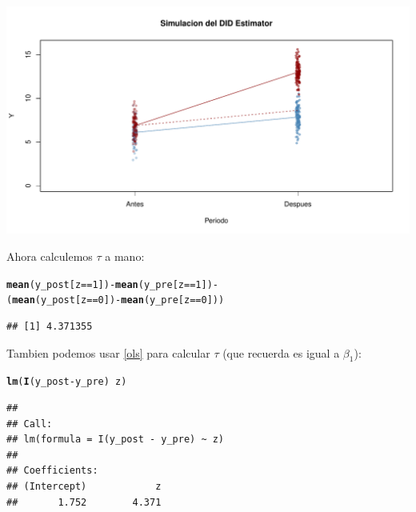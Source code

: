 \documentclass[onesided]{article}\usepackage[]{graphicx}\usepackage[]{color}
\makeatletter
\def\maxwidth{ %
  \ifdim\Gin@nat@width>\linewidth
    \linewidth
  \else
    \Gin@nat@width
  \fi
}
\newcommand{\hlnum}[1]{\textcolor[rgb]{0.686,0.059,0.569}{#1}}%
\newcommand{\hlopt}[1]{\textcolor[rgb]{0,0,0}{#1}}%
\newcommand{\hlstd}[1]{\textcolor[rgb]{0.345,0.345,0.345}{#1}}%
\newcommand{\hlkwd}[1]{\textcolor[rgb]{0.737,0.353,0.396}{\textbf{#1}}}%
\newenvironment{kframe}{%
 \def\at@end@of@kframe{}%
 \ifinner\ifhmode%
  \def\at@end@of@kframe{\end{minipage}}%
  \begin{minipage}{\columnwidth}%
 \fi\fi%
 \def\FrameCommand##1{\hskip\@totalleftmargin \hskip-\fboxsep
 \colorbox{shadecolor}{##1}\hskip-\fboxsep
     \hskip-\linewidth \hskip-\@totalleftmargin \hskip\columnwidth}%
 \MakeFramed {\advance\hsize-\width
   \@totalleftmargin\z@ \linewidth\hsize
   \@setminipage}}%
 {\par\unskip\endMakeFramed%
 \at@end@of@kframe}
\newenvironment{knitrout}{}{} %
\makeatother
\begin{document}
\begin{knitrout}
{\centering \includegraphics[width=\maxwidth]{figure/dif:dif:Data-1} 

}



\end{knitrout}

Ahora calculemos $\tau$ a mano:

\begin{knitrout}
\color{fgcolor}\begin{kframe}
\begin{alltt}
\hlkwd{mean}\hlstd{(y_post[z} \hlopt{==} \hlnum{1}\hlstd{])} \hlopt{-} \hlkwd{mean}\hlstd{(y_pre[z} \hlopt{==} \hlnum{1}\hlstd{])} \hlopt{-}
\hlstd{(}\hlkwd{mean}\hlstd{(y_post[z} \hlopt{==} \hlnum{0}\hlstd{])} \hlopt{-} \hlkwd{mean}\hlstd{(y_pre[z} \hlopt{==} \hlnum{0}\hlstd{]))}
\end{alltt}
\begin{verbatim}
## [1] 4.371355
\end{verbatim}
\end{kframe}
\end{knitrout}

Tambien podemos usar \autoref{ols} para calcular $\tau$ (que recuerda es igual a $\beta_{1}$):

\begin{knitrout}
\color{fgcolor}\begin{kframe}
\begin{alltt}
\hlkwd{lm}\hlstd{(}\hlkwd{I}\hlstd{(y_post} \hlopt{-} \hlstd{y_pre)} \hlopt{~} \hlstd{z)}
\end{alltt}
\begin{verbatim}
## 
## Call:
## lm(formula = I(y_post - y_pre) ~ z)
## 
## Coefficients:
## (Intercept)            z  
##       1.752        4.371
\end{verbatim}
\end{kframe}
\end{knitrout}
\end{document}
